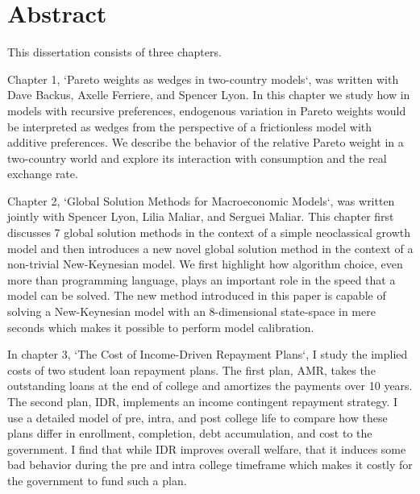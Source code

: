\documentclass[12pt,letterpaper,oneside,final]{memoir}
\begin{document}
\newpage

\chapter{Abstract}

  \DoubleSpacing

  This dissertation consists of three chapters.

  Chapter 1, `Pareto weights as wedges in two-country models`, was written with Dave Backus, Axelle
  Ferriere, and Spencer Lyon. In this chapter we study how in models with recursive preferences,
  endogenous variation in Pareto weights would be interpreted as wedges from the perspective of a
  frictionless model with additive preferences. We describe the behavior of the relative Pareto
  weight in a two-country world and explore its interaction with consumption and the real exchange
  rate.

  Chapter 2, `Global Solution Methods for Macroeconomic Models`, was written jointly with Spencer
  Lyon, Lilia Maliar, and Serguei Maliar. This chapter first discusses 7 global solution methods in
  the context of a simple neoclassical growth model and then introduces a new novel global solution
  method in the context of a non-trivial New-Keynesian model. We first highlight how algorithm
  choice, even more than programming language, plays an important role in the speed that a model can
  be solved. The new method introduced in this paper is capable of solving a New-Keynesian model
  with an 8-dimensional state-space in mere seconds which makes it possible to perform model
  calibration.

  In chapter 3, `The Cost of Income-Driven Repayment Plans`, I study the implied costs of two
  student loan repayment plans. The first plan, AMR, takes the outstanding loans at the end of
  college and amortizes the payments over 10 years. The second plan, IDR, implements an income
  contingent repayment strategy. I use a detailed model of pre, intra, and post college life to
  compare how these plans differ in enrollment, completion, debt accumulation, and cost to the
  government. I find that while IDR improves overall welfare, that it induces some bad behavior
  during the pre and intra college timeframe which makes it costly for the government to fund such
  a plan.

\newpage

\end{document}
